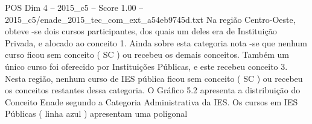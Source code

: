 \begin{textsample}{POS Dim 4 – 2015\_c5 – Score 1.00 – 2015\_c5/enade\_2015\_tec\_com\_ext\_a54eb9745d.txt}
Na região Centro-Oeste, obteve -se dois cursos participantes, dos quais um deles era de Instituição Privada, e alocado ao conceito 1.
Ainda sobre esta categoria nota -se que nenhum curso ficou sem conceito ( SC ) ou recebeu os demais conceitos.
Também um único curso foi oferecido por Instituições Públicas, e este recebeu conceito 3.
Nesta região, nenhum curso de IES pública ficou sem conceito ( SC ) ou recebeu os conceitos restantes dessa categoria.
O Gráfico 5.2 apresenta a distribuição do Conceito Enade segundo a Categoria Administrativa da IES.
Os cursos em IES Públicas ( linha azul ) apresentam uma poligonal

\end{textsample}
